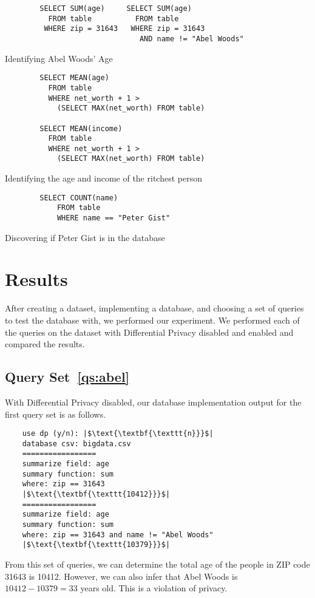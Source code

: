 \documentclass[conference,11pt]{IEEEtran}
\begin{document}
\begin{listing}[H]
    \begin{verbatim}
        SELECT SUM(age)     SELECT SUM(age)
          FROM table          FROM table
         WHERE zip = 31643   WHERE zip = 31643
                               AND name != "Abel Woods"
    \end{verbatim}
    \caption{Identifying Abel Woods' Age}
    \label{qs:abel}
\end{listing}

\begin{listing}[H]
    \begin{verbatim}
        SELECT MEAN(age)
          FROM table
          WHERE net_worth + 1 >
            (SELECT MAX(net_worth) FROM table)

        SELECT MEAN(income)
          FROM table
          WHERE net_worth + 1 >
            (SELECT MAX(net_worth) FROM table)
    \end{verbatim}
    \caption{Identifying the age and income of the ritchest person}
    \label{qs:richest-person}
\end{listing}

\begin{listing}[H]
    \begin{verbatim}
        SELECT COUNT(name)
            FROM table
            WHERE name == "Peter Gist"
    \end{verbatim}
    \caption{Discovering if Peter Gist is in the database}
    \label{qs:peter}
\end{listing}

\section{Results}\label{sec:results}
After creating a dataset, implementing a database, and choosing a set of queries
to test the database with, we performed our experiment. We performed each of the
queries on the dataset with Differential Privacy disabled and enabled and
compared the results.

\subsection{Query Set~\ref{qs:abel}}

With Differential Privacy disabled, our database implementation output for the
first query set is as follows.
\begin{verbatim}
    use dp (y/n): |$\text{\textbf{\texttt{n}}}$|
    database csv: bigdata.csv
    =================
    summarize field: age
    summary function: sum
    where: zip == 31643
    |$\text{\textbf{\texttt{10412}}}$|
    =================
    summarize field: age
    summary function: sum
    where: zip == 31643 and name != "Abel Woods"
    |$\text{\textbf{\texttt{10379}}}$|
\end{verbatim}
From this set of  queries, we can determine the total age of the people in ZIP
code 31643 is 10412. However, we can also infer that Abel Woods is $10412 -
10379 = 33$ years old. This is a violation of privacy.
\end{document}
